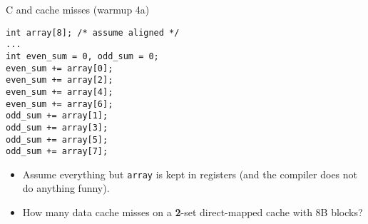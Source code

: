 
\begin{frame}[fragile,label=arrayMissesWarmup4a]{C and cache misses (warmup 4a)}
\begin{lstlisting}[style=smaller]
int array[8]; /* assume aligned */
...
int even_sum = 0, odd_sum = 0;
even_sum += array[0];
even_sum += array[2];
even_sum += array[4];
even_sum += array[6];
odd_sum += array[1];
odd_sum += array[3];
odd_sum += array[5];
odd_sum += array[7];
\end{lstlisting}
\begin{itemize}
\item {\small
Assume everything but {\tt array} is kept in registers (and the compiler does not do
anything funny).}
\item How many data cache misses on a \textbf{2}-set direct-mapped cache with 8B blocks?
\end{itemize}
\end{frame}

